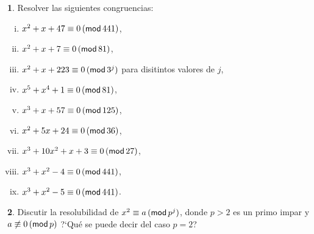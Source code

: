 \theoremstyle{definition}
\newtheorem{ejerHensel}{\ejername}[section]


\begin{ejerHensel}
	Resolver las siguientes congruencias:
	\begin{enumerate}[(i)]
		\item $x^2+x+47\equiv 0\tmodulo[441]$,
		\item $x^2+x+7\equiv 0\tmodulo[81]$,
		\item $x^2+x+223\equiv 0\tmodulo[3^j]$
			para disitintos valores de $j$,
		\item $x^5+x^4+1\equiv 0\tmodulo[81]$,
		\item $x^3+x+57\equiv 0\tmodulo[125]$,
		\item $x^2+5x+24\equiv 0\tmodulo[36]$,
		\item $x^3+10x^2+x+3\equiv 0\tmodulo[27]$,
		\item $x^3+x^2-4\equiv 0\tmodulo[441]$,
		\item $x^3+x^2-5\equiv 0\tmodulo[441]$.
	\end{enumerate}
\end{ejerHensel}

\begin{ejerHensel}
	Discutir la resolubilidad de $x^2\equiv a\tmodulo[p^j]$,
	donde $p>2$ es un primo impar y $a\not\equiv 0\tmodulo[p]$
	?`Qu\'e se puede decir del caso $p=2$?
\end{ejerHensel}


